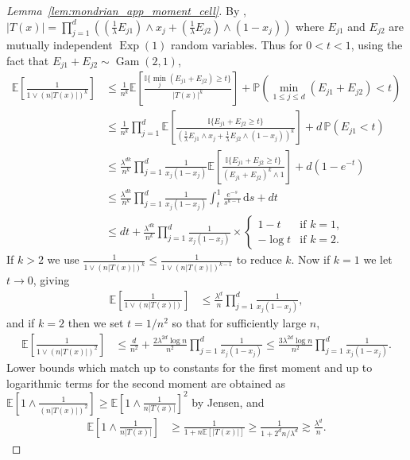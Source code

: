\documentclass[11pt,lof]{puthesis}
\renewcommand{\P}{\ensuremath{\mathbb{P}}}
\newcommand{\E}{\ensuremath{\mathbb{E}}}
\newcommand{\I}{\ensuremath{\mathbb{I}}}
\DeclareMathOperator{\Gam}{Gam}
\DeclareMathOperator{\Exp}{Exp}
\newcommand{\diff}[1]{\,\mathrm{d}#1}
\theoremstyle{break}
\theoremstyle{proof}
\newtheorem{proof}{Proof}
\begin{document}
\begin{proof}[Lemma~\ref{lem:mondrian_app_moment_cell}]

By \citet[Proposition~1]{mourtada2020minimax},
$|T(x)| = \prod_{j=1}^{d}
\left(
\left(\frac{1}{\lambda} E_{j1} \right) \wedge x_j
+ \left( \frac{1}{\lambda} E_{j2} \right) \wedge (1-x_j)
\right)$
where $E_{j1}$ and $E_{j2}$
are mutually independent $\Exp(1)$ random variables.
Thus for $0<t<1$,
using the fact that $E_{j1} + E_{j2} \sim \Gam(2, 1)$,
%
\begin{align*}
\E \left[
\frac{1}{1 \vee (n |T(x)|)^k}
\right]
&\leq
\frac{1}{n^k}
\E \left[
\frac{\I\{\min_j (E_{j1} + E_{j2}) \geq t\}}{|T(x)|^k}
\right]
+ \P \left(\min_{1 \leq j \leq d} (E_{j1} + E_{j2}) < t\right) \\
&\leq
\frac{1}{n^k}
\prod_{j=1}^d
\E \left[
\frac{\I\{E_{j1} + E_{j2} \geq t\}}
{\left(\frac{1}{\lambda} E_{j1} \wedge x_j
+ \frac{1}{\lambda} E_{j2} \wedge (1-x_j)\right)^k}
\right]
+ d\, \P \left(E_{j1} < t\right) \\
&\leq
\frac{\lambda^{d k}}{n^k}
\prod_{j=1}^d
\frac{1}{x_j(1-x_j)}
\E \left[
\frac{\I\{E_{j1} + E_{j2} \geq t\}}
{(E_{j1} + E_{j2})^k \wedge 1}
\right]
+ d (1 - e^{-t}) \\
&\leq
\frac{\lambda^{d k}}{n^k}
\prod_{j=1}^d
\frac{1}{x_j(1-x_j)}
\int_{t}^{1}
\frac{e^{-s}}{s^{k-1}}
\diff s
+ d t \\
&\leq
d t
+ \frac{\lambda^{d k}}{n^k}
\prod_{j=1}^d
\frac{1}{x_j(1-x_j)}
\times
\begin{cases}
1-t & \text{if } k = 1, \\
-\log t & \text{if } k = 2.
\end{cases}
\end{align*}
%
If $k>2$ we use
$\frac{1}{1 \vee (n |T(x)|)^k} \leq \frac{1}{1 \vee (n |T(x)|)^{k-1}}$
to reduce $k$. Now if $k = 1$ we let $t \to 0$, giving
%
\begin{align*}
\E \left[
\frac{1}{1 \vee (n |T(x)|)}
\right]
&\leq
\frac{\lambda^d}{n}
\prod_{j=1}^d
\frac{1}{x_j(1-x_j)},
\end{align*}
%
and if $k = 2$ then we set $t = 1/n^2$ so that for
sufficiently large $n$,
%
\begin{align*}
\E \left[
\frac{1}{1 \vee (n |T(x)|)^2}
\right]
&\leq
\frac{d}{n^2}
+ \frac{2 \lambda^{2d} \log n}{n^2}
\prod_{j=1}^d
\frac{1}{x_j(1-x_j)}
\leq
\frac{3 \lambda^{2d} \log n}{n^2}
\prod_{j=1}^d
\frac{1}{x_j(1-x_j)}.
\end{align*}
%
Lower bounds which match up to constants for the first moment and up to
logarithmic terms for the second moment are obtained as
$\E \left[ 1 \wedge \frac{1}{(n|T(x)|)^2} \right]
\geq \E \left[ 1 \wedge \frac{1}{n|T(x)|} \right]^2$
by Jensen, and
%
\begin{align*}
\E \left[ 1 \wedge \frac{1}{n|T(x)|} \right]
&\geq \frac{1}{1 + n \E \left[ |T(x)| \right]}
\geq \frac{1}{1 + 2^d n / \lambda^d}
\gtrsim \frac{\lambda^d}{n}.
\end{align*}
\end{proof}
\end{document}
